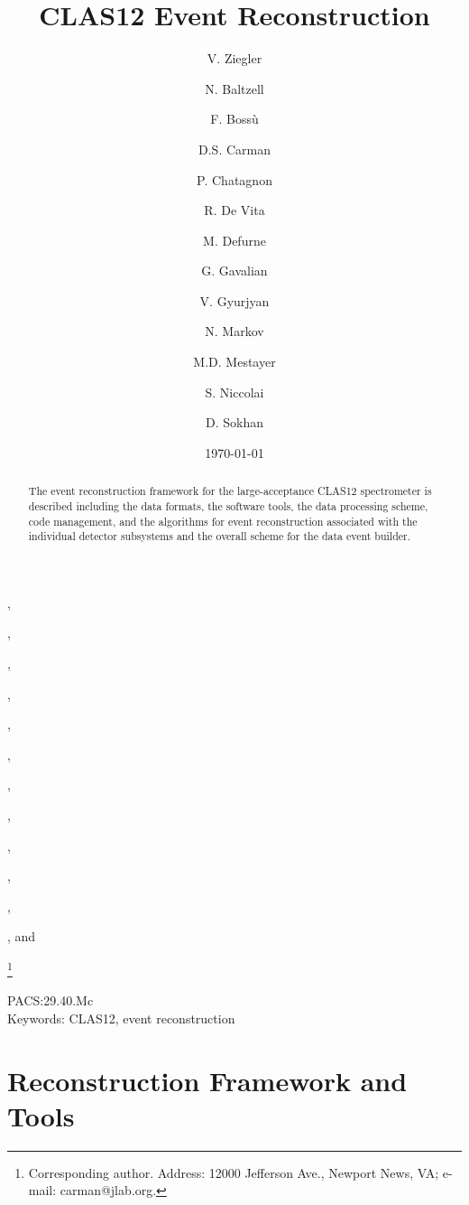 \documentclass{elsart}
\begin{document}
\begin{frontmatter}

\title{CLAS12 Event Reconstruction}

\author[JLab]{V. Ziegler},
\author[JLab]{N. Baltzell},
\author[Saclay]{F. Boss\`u},
\author[JLab]{D.S. Carman},
\author[IPNO]{P. Chatagnon},
\author[INFN]{R. De Vita},
\author[Saclay]{M. Defurne},
\author[JLab]{G. Gavalian},
\author[JLab]{V. Gyurjyan},
\author[JLab]{N. Markov},
\author[JLab]{M.D. Mestayer}, 
\author[IPNO]{S. Niccolai}, and
\author[Glasgow]{D. Sokhan}

\address[JLab]{Thomas Jefferson National Accelerator Facility, Newport News, VA 23606, USA}
\address[INFN]{INFN, Sezione di Genova, 16146 Genova, Italy}
\address[Saclay]{CEA-Saclay, Univ. Paris-Sud, Universit\'e Paris-Saclay, Gif-sur-Yvettes, France}
\address[IPNO]{Institut de Physique Nucl\'eaire, CNRS-IN2P3, Univ. Paris-Sud, Universit\'e Paris-Saclay,
  91406 Orsay Cedex, France}
\address[Glasgow]{University of Glasgow, Glasgow G12 8QQ, United Kingdom}
\thanks[corresponding]{Corresponding author. Address: 12000 Jefferson Ave., Newport News, VA; 
e-mail: carman@jlab.org.}

\date{\today}


\begin{abstract}
  The event reconstruction framework for the large-acceptance CLAS12 spectrometer is described including
  the data formats, the software tools, the data processing scheme, code management, and the algorithms
  for event reconstruction associated with the individual detector subsystems and the overall scheme for the
  data event builder.
\end{abstract}

\end{frontmatter}

PACS:29.40.Mc \\
Keywords: CLAS12, event reconstruction
\newpage

\newpage
\tableofcontents

\vfil
\eject

\section{Reconstruction Framework and Tools}
\end{document}
